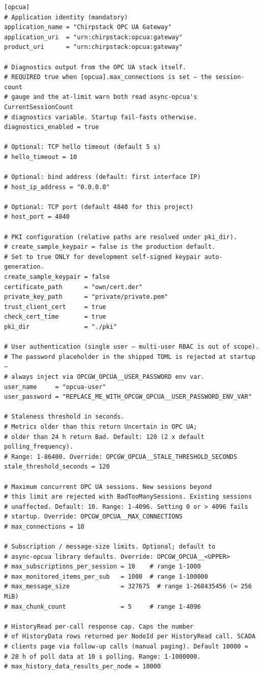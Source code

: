 \begin{lstlisting}
[opcua]
# Application identity (mandatory)
application_name = "Chirpstack OPC UA Gateway"
application_uri  = "urn:chirpstack:opcua:gateway"
product_uri      = "urn:chirpstack:opcua:gateway"

# Diagnostics output from the OPC UA stack itself.
# REQUIRED true when [opcua].max_connections is set — the session-count
# gauge and the at-limit warn both read async-opcua's CurrentSessionCount
# diagnostics variable. Startup fail-fasts otherwise.
diagnostics_enabled = true

# Optional: TCP hello timeout (default 5 s)
# hello_timeout = 10

# Optional: bind address (default: first interface IP)
# host_ip_address = "0.0.0.0"

# Optional: TCP port (default 4840 for this project)
# host_port = 4840

# PKI configuration (relative paths are resolved under pki_dir).
# create_sample_keypair = false is the production default.
# Set to true ONLY for development self-signed keypair auto-generation.
create_sample_keypair = false
certificate_path      = "own/cert.der"
private_key_path      = "private/private.pem"
trust_client_cert     = true
check_cert_time       = true
pki_dir               = "./pki"

# User authentication (single user — multi-user RBAC is out of scope).
# The password placeholder in the shipped TOML is rejected at startup —
# always inject via OPCGW_OPCUA__USER_PASSWORD env var.
user_name     = "opcua-user"
user_password = "REPLACE_ME_WITH_OPCGW_OPCUA__USER_PASSWORD_ENV_VAR"

# Staleness threshold in seconds.
# Metrics older than this return Uncertain in OPC UA;
# older than 24 h return Bad. Default: 120 (2 x default polling_frequency).
# Range: 1-86400. Override: OPCGW_OPCUA__STALE_THRESHOLD_SECONDS
stale_threshold_seconds = 120

# Maximum concurrent OPC UA sessions. New sessions beyond
# this limit are rejected with BadTooManySessions. Existing sessions
# unaffected. Default: 10. Range: 1-4096. Setting 0 or > 4096 fails
# startup. Override: OPCGW_OPCUA__MAX_CONNECTIONS
# max_connections = 10

# Subscription / message-size limits. Optional; default to
# async-opcua library defaults. Override: OPCGW_OPCUA__<UPPER>
# max_subscriptions_per_session = 10    # range 1-1000
# max_monitored_items_per_sub   = 1000  # range 1-100000
# max_message_size              = 327675  # range 1-268435456 (≈ 256 MiB)
# max_chunk_count               = 5     # range 1-4096

# HistoryRead per-call response cap. Caps the number
# of HistoryData rows returned per NodeId per HistoryRead call. SCADA
# clients page via follow-up calls (manual paging). Default 10000 ≈
# 28 h of poll data at 10 s polling. Range: 1-1000000.
# max_history_data_results_per_node = 10000
\end{lstlisting}

